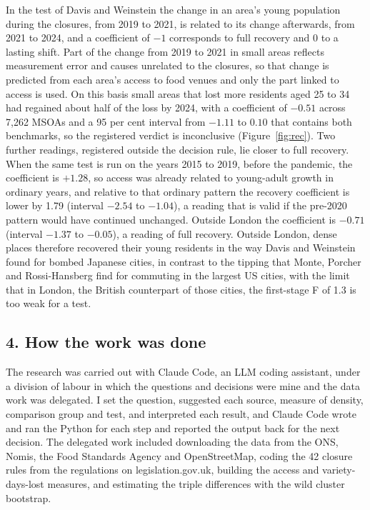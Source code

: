 \documentclass[11pt,a4paper]{article}
\begin{document}
In the test of Davis and Weinstein the change in an area's young population during the closures, from 2019 to 2021, is related to its change afterwards, from 2021 to 2024, and a coefficient of $-1$ corresponds to full recovery and 0 to a lasting shift. Part of the change from 2019 to 2021 in small areas reflects measurement error and causes unrelated to the closures, so that change is predicted from each area's access to food venues and only the part linked to access is used. On this basis small areas that lost more residents aged 25 to 34 had regained about half of the loss by 2024, with a coefficient of $-0.51$ across 7,262 MSOAs and a 95 per cent interval from $-1.11$ to $0.10$ that contains both benchmarks, so the registered verdict is inconclusive (Figure~\ref{fig:rec}). Two further readings, registered outside the decision rule, lie closer to full recovery. When the same test is run on the years 2015 to 2019, before the pandemic, the coefficient is $+1.28$, so access was already related to young-adult growth in ordinary years, and relative to that ordinary pattern the recovery coefficient is lower by 1.79 (interval $-2.54$ to $-1.04$), a reading that is valid if the pre-2020 pattern would have continued unchanged. Outside London the coefficient is $-0.71$ (interval $-1.37$ to $-0.05$), a reading of full recovery. Outside London, dense places therefore recovered their young residents in the way Davis and Weinstein found for bombed Japanese cities, in contrast to the tipping that Monte, Porcher and Rossi-Hansberg find for commuting in the largest US cities, with the limit that in London, the British counterpart of those cities, the first-stage F of 1.3 is too weak for a test.

\subsection*{4. How the work was done}

The research was carried out with Claude Code, an LLM coding assistant, under a division of labour in which the questions and decisions were mine and the data work was delegated. I set the question, suggested each source, measure of density, comparison group and test, and interpreted each result, and Claude Code wrote and ran the Python for each step and reported the output back for the next decision. The delegated work included downloading the data from the ONS, Nomis, the Food Standards Agency and OpenStreetMap, coding the 42 closure rules from the regulations on legislation.gov.uk, building the access and variety-days-lost measures, and estimating the triple differences with the wild cluster bootstrap.
\end{document}

